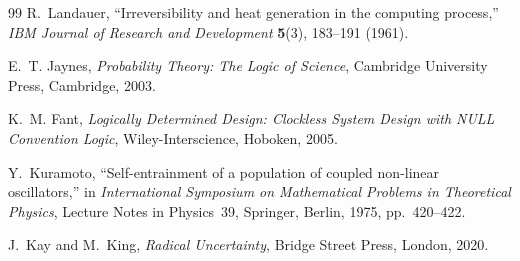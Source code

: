 \documentclass[12pt,a4paper]{book}
\theoremstyle{remark}
\theoremstyle{definition}
\begin{document}
\begin{thebibliography}{99}
R.~Landauer,
``Irreversibility and heat generation in the computing process,''
\textit{IBM Journal of Research and Development} \textbf{5}(3),
183--191 (1961).

E.~T. Jaynes,
\textit{Probability Theory: The Logic of Science},
Cambridge University Press, Cambridge, 2003.

K.~M. Fant,
\textit{Logically Determined Design: Clockless System Design with NULL
Convention Logic},
Wiley-Interscience, Hoboken, 2005.

Y.~Kuramoto,
``Self-entrainment of a population of coupled non-linear oscillators,''
in \textit{International Symposium on Mathematical Problems in Theoretical
Physics}, Lecture Notes in Physics~39, Springer, Berlin, 1975, pp.~420--422.

J.~Kay and M.~King,
\textit{Radical Uncertainty},
Bridge Street Press, London, 2020.

\end{thebibliography}
\end{document}
